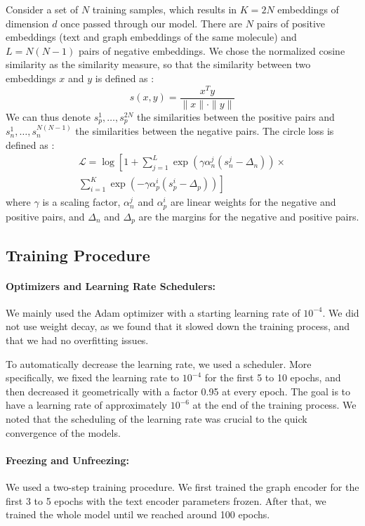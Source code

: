 \documentclass[switch, 11pt]{article}
\begin{document}
\begin{multicols}{2}
    Consider a set of $N$ training samples, which results in $K=2N$ embeddings of dimension $d$ once passed through our model. There are $N$ pairs of positive embeddings (text and graph embeddings of the same molecule) and $L=N(N-1)$ pairs of negative embeddings. We chose the normalized cosine similarity as the similarity measure, so that the similarity between two embeddings $x$ and $y$ is defined as :
    \begin{equation}
        s(x,y)=\frac{x^Ty}{\|x\|\cdot\|y\|}
    \end{equation}
    We can thus denote $s_p^1,\dots,s_p^{2N}$ the similarities between the positive pairs and $s_n^1,\dots,s_n^{N(N-1)}$ the similarities between the negative pairs. The circle loss is defined as :
    \begin{align*}
        \mathcal{L}=\log\left[1+\sum_{j=1}^{L}\exp(\gamma\alpha_{n}^{j}(s_{n}^{j}-\Delta_{n}))\times \right. \\ \left.\sum_{i=1}^{K}\exp(-\gamma\alpha_{p}^{i}(s_{p}^{i}-\Delta_{p}))\right]
    \end{align*}
    where $\gamma$ is a scaling factor, $\alpha_{n}^{j}$ and $\alpha_{p}^{i}$ are linear weights for the negative and positive pairs, and $\Delta_{n}$ and $\Delta_{p}$ are the margins for the negative and positive pairs.

    \subsection{Training Procedure}
    \paragraph*{Optimizers and Learning Rate Schedulers:} We mainly used the Adam optimizer with a starting learning rate of $10^{-4}$. We did not use weight decay, as we found that it slowed down the training process, and that we had no overfitting issues.

    To automatically decrease the learning rate, we used a scheduler. More specifically, we fixed the learning rate to $10^{-4}$ for the first 5 to 10 epochs, and then decreased it geometrically with a factor 0.95 at every epoch. The goal is to have a learning rate of approximately $10^{-6}$ at the end of the training process. We noted that the scheduling of the learning rate was crucial to the quick convergence of the models.

    \paragraph*{Freezing and Unfreezing:}
    We used a two-step training procedure. We first trained the graph encoder for the first 3 to 5 epochs with the text encoder parameters frozen. After that, we trained the whole model until we reached around 100 epochs.


\end{multicols}
\end{document}
